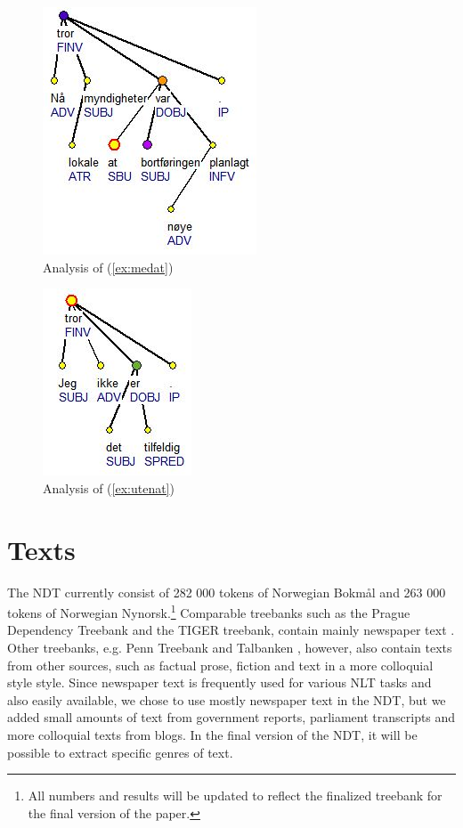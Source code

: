 \documentclass[11pt,a4paper]{article}
\begin{document}
\begin{figure}[h!]
  \centering
    \includegraphics{medat.jpg}
    \caption{Analysis of (\ref{ex:medat})}
    \label{figure:medat}
\end{figure}

\begin{figure}[h!]
  \centering
    \includegraphics{utenat.jpg}
    \caption{Analysis of (\ref{ex:utenat})}
    \label{figure:utenat}
\end{figure}


\section{Texts}
The NDT currently consist of 282 000 tokens of Norwegian Bokmål and 263 000 tokens of Norwegian Nynorsk.\footnote{All numbers and results will be updated to reflect the finalized treebank for the final version of the paper.} Comparable treebanks such as the Prague Dependency Treebank and the TIGER treebank, contain mainly newspaper text \cite{Boh:Haj:Hla:2003,Bra:2004}. Other treebanks, e.g. Penn Treebank and Talbanken \cite{Mar:San:Mar:93,Niv:Nil:Hal:2006}, however, also contain texts from other sources, such as factual prose, fiction and text in a more colloquial style style. Since newspaper text is frequently used for various NLT tasks and also easily available, we chose to use mostly newspaper text in the NDT, but we added small amounts of text from government reports, parliament transcripts and more colloquial texts from blogs. In the final version of the NDT, it will be possible to extract specific genres of text.
\end{document}
